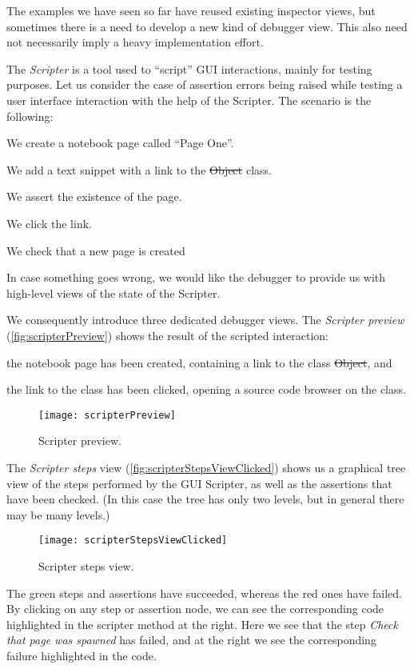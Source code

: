 \documentclass[sigplan,10pt]{acmart}
\newcommand\on[1]{\nbc{ON}{#1}{olive}} %
\newcommand\ac[1]{\nbc{AC}{#1}{teal}}
\newcommand{\GT}{\lst{GT}\xspace} %
\begin{document}

The examples we have seen so far have reused existing inspector views, but sometimes there is a need to develop a new kind of debugger view.
This also need not necessarily imply a heavy implementation effort.

The \GT \emph{Scripter} is a tool used to ``script'' GUI interactions, mainly for testing purposes.
Let us consider the case of assertion errors being raised while testing a user interface interaction with the help of the Scripter.
The scenario is the following:
\begin{inparaenum}[(i)]
	\item We create a notebook page called ``Page One''.
	\item We add a text snippet with a link to the \st{Object} class.
	\item We assert the existence of the page.
	\item We click the link.
	\item We check that a new page is created 
	\on{fixed}
\end{inparaenum}
In case something goes wrong, we would like the debugger to provide us with high-level views of the state of the Scripter.

We consequently introduce three dedicated debugger views.
The \emph{Scripter preview} (\autoref{fig:scripterPreview}) shows the result of the scripted interaction:
\begin{inparaenum}[(i)]
	\item the notebook page has been created, containing a link to the class \st{Object}, and
	\item the link to the class has been clicked, opening a source code browser on the class.
\end{inparaenum}
\begin{figure}[h]
  \texttt{[image: scripterPreview]}
  \caption{Scripter preview.}
  \label{fig:scripterPreview}
\end{figure}

The \emph{Scripter steps} view (\autoref{fig:scripterStepsViewClicked}) shows us a graphical tree view of the steps performed by the GUI Scripter, as well as the assertions that have been checked.
(In this case the tree has only two levels, but in general there may be many levels.)
\begin{figure}[h]
  \texttt{[image: scripterStepsViewClicked]}
  \caption{Scripter steps view.}
  \label{fig:scripterStepsViewClicked}
\end{figure}
The green steps and assertions have succeeded, whereas the red ones have failed.
By clicking on any step or assertion node, we can see the corresponding code highlighted in the scripter method at the right.
Here we see that the step \emph{Check that page was spawned} has failed, and at the right we see the corresponding failure highlighted in the code.
\end{document}
